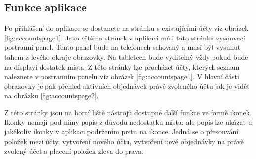 \subsection{Funkce aplikace}

Po přihlášení do aplikace se dostanete na stránku s existujícími účty viz obrázek \ref{fig:accountspage1}.
Jako většina stránek v aplikaci má i tato stránka vysouvací postranní panel.
Tento panel bude na telefonech schovaný a musí být vysunut tahem z levého okraje obrazovky.
Na tabletech bude vyditelný vždy pokud bude na displayi dostatek místa.
Z této stránky lze procházet účty, kterých seznam naleznete v postranním panelu viz obrázek \ref{fig:accountspage1}.
V hlavní části obrazovky je pak přehled aktivních objednávek právě zvoleného účtu jak je vidět na obrázku \ref{fig:accountspage2}.

Z této stránky jsou na horní liště nástrojů dostupné další funkce ve formě ikonek.
Ikonky nemají pod nimy popis z důvodu nedostatku místa, ale popis lze ukázat u jakékoliv ikonky v aplikaci podržením prstu na ikonce.
Jedná se o přesouvání položek mezi účty, vytvoření nového účtu, vytvoření nové objednávky na právě zvolený účet a placení položek zleva do prava. \\

